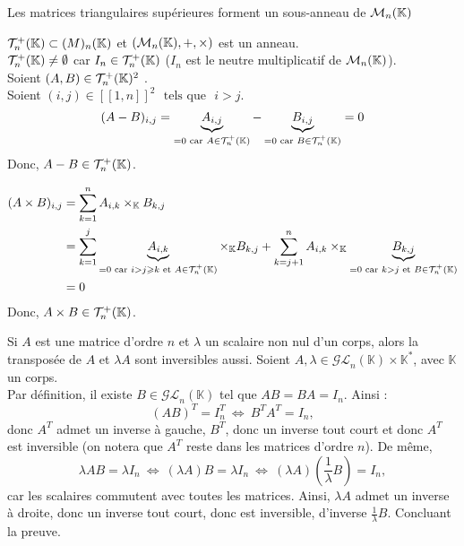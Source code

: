 \documentclass{article}
\renewenvironment{question_kholle}[2][ ]
{
	\subsection{\texorpdfstring{#2}{}}
	\notblank{#1}
	{
		\noindent #1
		\bigbreak
	}
	{}
	\begin{proof}
}
{
	\end{proof}
}
\begin{document}
\begin{question_kholle}
  {Les matrices triangulaires supérieures forment un sous-anneau de $\mathcal{M}_n(\mathbb K)$}

  $\mathcal{T}_n^+(\mathbb K) \subset \mathcal(M)_n(\mathbb K)$ et $(\mathcal{M}_n(\mathbb K), +, \times)$ est un anneau. \\
  $\mathcal{T}_n^+(\mathbb K) \neq \emptyset$ car $I_n \in \mathcal{T}_n^+(\mathbb K)$ ($I_n$ est le neutre multiplicatif de $\mathcal{M}_n(\mathbb K)$). \\
  Soient $(A, B) \in \mathcal{T}_n^+(\mathbb K)^2$ . \\
  Soient $(i, j) \in [\![1,n]\!]^2$ $\text{ tels que }$ $i > j$.
  \begin{equation*}
    (A - B)_{i,j}
    = \underbrace{A_{i,j}}_{=0 \text{ car } A \in \mathcal{T}_n^+(\mathbb K)} - \underbrace{B_{i,j}}_{=0 \text{ car } B \in \mathcal{T}_n^+(\mathbb K)}
    = 0
  \end{equation*}
  Donc, $A - B \in \mathcal{T}_n^+(\mathbb K)$.

  \begin{equation*}
    \begin{aligned}
      (A \times B)_{i,j}
       & = \sum_{k=1}^{n} A_{i,k} \times_{\mathbb K} B_{k,j}                                                                                        \\
       & = \sum_{k=1}^{j} \underbrace{A_{i,k}}_{=0 \text{ car } i > j \geqslant k \text{ et } A \in \mathcal{T}_n^+(\mathbb K)} \times_{\mathbb K} B_{k,j}
      + \sum_{k=j+1}^{n} A_{i,k} \times_{\mathbb K} \underbrace{B_{k,j}}_{=0 \text{ car } k > j \text{ et } B \in \mathcal{T}_n^+(\mathbb K)}              \\
       & = 0
    \end{aligned}
  \end{equation*}
  Donc, $A \times B \in \mathcal{T}_n^+(\mathbb K)$.
\end{question_kholle}

\begin{question_kholle}
  {Si $A$ est une matrice d'ordre $n$ et $\lambda$ un scalaire non nul d'un corps, alors la transposée de $A$ et $\lambda A$ sont inversibles aussi.}
  Soient $A,\lambda \in \mathcal{GL}_n(\mathbb{K})\times \mathbb{K}^*$, avec $\mathbb{K}$ un corps. \\
  Par définition, il existe $B\in \mathcal{GL}_n(\mathbb{K})$ tel que $AB=BA=I_n$. Ainsi :
  \[
    (AB)^T = I_n^T \ \iff \ B^TA^T = I_n,
  \]
  donc $A^T$ admet un inverse à gauche, $B^T$, donc un inverse tout court et donc $A^T$ est inversible (on notera que $A^T$ reste dans les matrices d'ordre $n$). De même,
  \[
    \lambda AB = \lambda I_n \ \iff \ (\lambda A)B = \lambda I_n \ \iff \ (\lambda A) \left(\frac{1}{\lambda}B \right) = I_n,
  \]
  car les scalaires commutent avec toutes les matrices. Ainsi, $\lambda A$ admet un inverse à droite, donc un inverse tout court, donc est inversible, d'inverse $\frac{1}{\lambda}B$. Concluant la preuve.
\end{question_kholle}
\end{document}
